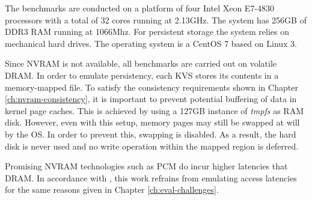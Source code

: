 
The benchmarks are conducted on a platform of four Intel Xeon E7-4830 processors with a total of 32 cores running at 2.13GHz. The system has 256GB of DDR3 RAM running at 1066Mhz. For persistent storage the system relies on mechanical hard drives. The operating system is a CentOS 7 based on Linux 3.

Since NVRAM is not available, all benchmarks are carried out on volatile DRAM. In order to emulate persistency, each KVS stores its contents in a memory-mapped file. To satisfy the consistency requirements shown in Chapter \ref{ch:nvram-consistency}, it is important to prevent potential buffering of data in kernel page caches. This is achieved by using a 127GB instance of \emph{tmpfs} as RAM disk. However, even with this setup, memory pages may still be swapped at will by the OS. In order to prevent this, swapping is disabled. As a result, the hard disk is never used and no write operation within the mapped region is deferred.


Promising NVRAM technologies such as PCM do incur higher latencies that DRAM. In accordance with \cite{bailey2013exploring, zhou2016nvht}, this work refrains from emulating access latencies for the same reasons given in Chapter \ref{ch:eval-challenges}.
